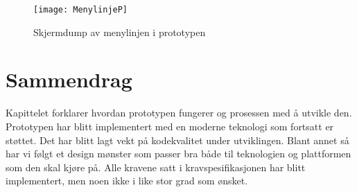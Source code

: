  
\begin{figure}[ht!] 
\centering 
\texttt{[image: MenylinjeP]} 
\caption{Skjermdump av menylinjen i prototypen} 
\label{fig:menylinjen} 
\end{figure} 
 
 
\section{Sammendrag} 

Kapittelet forklarer hvordan prototypen fungerer og prosessen med å utvikle den. Prototypen har blitt implementert med en moderne teknologi som fortsatt er støttet. Det har blitt lagt vekt på kodekvalitet under utviklingen. Blant annet så har vi følgt et design mønster som passer bra både til teknologien og plattformen som den skal kjøre på. Alle kravene satt i kravspesifikasjonen har blitt implementert, men noen ikke i like stor grad som ønsket. 

